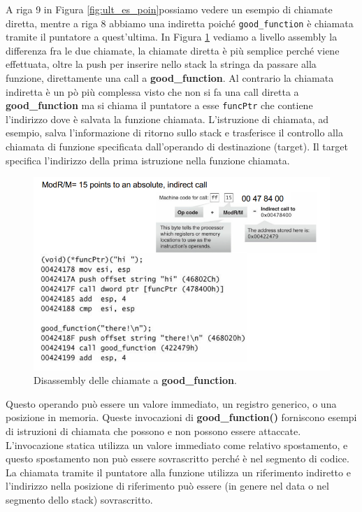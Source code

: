 A riga 9 in Figura \ref{fig:ult_es_poin}possiamo vedere un esempio di chiamate diretta, mentre a riga 8 abbiamo una indiretta poiché \verb|good_function| è chiamata tramite il puntatore a quest'ultima. In Figura \ref{fig:dissas_ult_es_poin} vediamo a livello assembly la differenza fra le due chiamate, la chiamate diretta è più semplice perché viene effettuata, oltre la push per inserire nello stack la stringa da passare alla funzione, direttamente una call a \textbf{good\_function}. Al contrario la chiamata indiretta è un pò più complessa visto che non si fa una call diretta a \textbf{good\_function} ma si chiama il puntatore a esse \verb|funcPtr| che contiene l'indirizzo dove è salvata la funzione chiamata. L'istruzione di chiamata, ad esempio, salva l'informazione di ritorno sullo stack e trasferisce il controllo alla chiamata di funzione specificata dall'operando di destinazione (target). Il target specifica l'indirizzo della prima istruzione nella funzione chiamata.
\begin{figure}[H]
	\centering
	\includegraphics[width=12cm, keepaspectratio]{capitoli/secure_coding/img/cap_5/dissas_ult_es_point.png}
	\caption{Disassembly delle chiamate a \textbf{good\_function}.}\label{fig:dissas_ult_es_poin}
\end{figure}
Questo operando può essere un valore immediato, un registro generico, o una posizione in memoria. Queste invocazioni di \textbf{good\_function()} forniscono esempi di istruzioni di chiamata che possono e non possono essere attaccate. L'invocazione statica utilizza un valore immediato come relativo spostamento, e questo spostamento non può essere sovrascritto perché è nel segmento di codice. La chiamata tramite il puntatore alla funzione utilizza un riferimento indiretto e l'indirizzo nella posizione di riferimento può essere (in genere nel data o nel segmento dello stack) sovrascritto.
